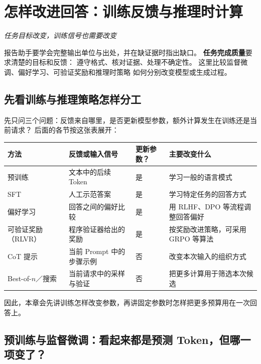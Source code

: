 \chapterrule
\section{怎样改进回答：训练反馈与推理时计算}
\label{intro:23c-post-training}
\label{intro:23cc-test-time-compute}

\begin{idea}
\noindent\emph{任务目标改变，训练信号也需要改变}\par

报告助手要学会完整输出单位与出处，并在缺证据时指出缺口。
\textbf{任务完成质量}要求清楚的目标和反馈：
遵守格式、核对证据、处理不确定性。
这里比较监督微调、偏好学习、可验证奖励和推理时策略
如何分别改变模型或生成过程。
\end{idea}

\subsection{先看训练与推理策略怎样分工}
\label{sec:training-inference-roles}

先只问三个问题：反馈来自哪里，是否更新模型参数，额外计算发生在训练还是当前请求？
后面的各节按这张表展开：

\begin{center}
\small
\renewcommand{\arraystretch}{1.25}
\begin{tabularx}{\linewidth}{@{}p{29mm}p{36mm}p{19mm}X@{}}\toprule
方法 & 反馈或输入信号 & 更新参数？ & 主要改变什么\\\midrule
预训练 & 文本中的后续 Token & 是 & 学习一般的语言模式\\
SFT & 人工示范答案 & 是 & 学习特定任务的回答方式\\
偏好学习 & 回答之间的偏好比较 & 是 & 用 RLHF、DPO 等流程调整回答偏好\\
可验证奖励（RLVR） & 程序验证器给出的奖励 & 是 & 按奖励改进策略，可采用 GRPO 等算法\\
CoT 提示 & 当前 Prompt 中的步骤示例 & 否 & 改变本次输入的组织方式\\
Best-of-$n$／搜索 & 当前请求中的采样与验证 & 否 & 把更多计算用于筛选本次候选\\
\bottomrule
\end{tabularx}
\end{center}

因此，本章会先讲训练怎样改变参数，再讲固定参数时怎样把更多预算用在一次回答上。

\subsection{预训练与监督微调：看起来都是预测 Token，但哪一项变了？}
\label{concept:sft}

